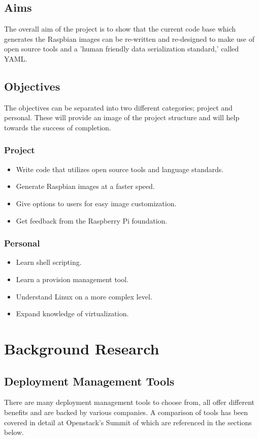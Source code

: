 \documentclass[12pt,a4paper]{report}
\begin{document}
\section{Aims}
The overall aim of the project is to show that the current code base which generates the Raspbian images can be re-written and re-designed to make use of open source tools and a 'human friendly data serialization standard,' \citep{yaml} called YAML. 
\section{Objectives}
The objectives can be separated into two different categories; project and personal. These will provide an image of the project structure and will help towards the success of completion. 
\subsection{Project}
\begin{itemize}
\item{Write code that utilizes open source tools and language standards.}
\item{Generate Raspbian images at a faster speed.}
\item{Give options to users for easy image customization.}
\item{Get feedback from the Raspberry Pi foundation.}
\end{itemize}  
\subsection{Personal}
\begin{itemize}
\item{Learn shell scripting.}
\item{Learn a provision management tool.}
\item{Understand Linux on a more complex level.}
\item{Expand knowledge of virtualization.}
\end{itemize}  

\chapter{Background Research}
\section{Deployment Management Tools}
There are many deployment management tools to choose from, all offer different benefits and are backed by various companies. A comparison of tools has been covered in detail at Openstack's Summit \citep{openstack} of which are referenced in the sections below.    	
\end{document}
